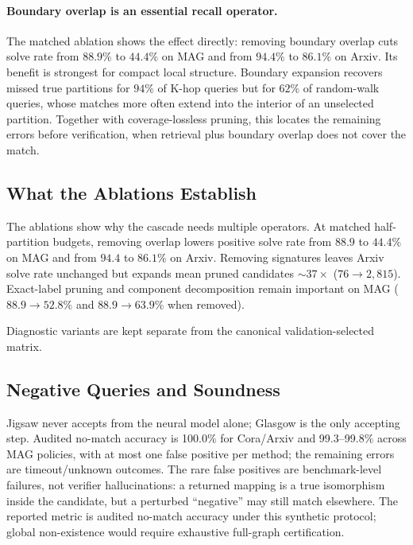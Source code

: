 \documentclass[runningheads]{llncs}
\begin{document}
\paragraph{Boundary overlap is an essential recall operator.}
The matched ablation shows the effect directly: removing boundary overlap cuts solve rate from $88.9\%$ to $44.4\%$ on MAG and from $94.4\%$ to $86.1\%$ on Arxiv. Its benefit is strongest for compact local structure. Boundary expansion recovers missed true partitions for $94\%$ of K-hop queries but for $62\%$ of random-walk queries, whose matches more often extend into the interior of an unselected partition. Together with coverage-lossless pruning, this locates the remaining errors before verification, when retrieval plus boundary overlap does not cover the match.

\subsection{What the Ablations Establish}

The ablations show why the cascade needs multiple operators. At matched half-partition budgets, removing overlap lowers positive solve rate from $88.9$ to $44.4\%$ on MAG and from $94.4$ to $86.1\%$ on Arxiv. Removing signatures leaves Arxiv solve rate unchanged but expands mean pruned candidates ${\sim}37\times$ ($76\to2{,}815$). Exact-label pruning and component decomposition remain important on MAG ($88.9\to52.8\%$ and $88.9\to63.9\%$ when removed).

Diagnostic variants are kept separate from the canonical validation-selected matrix.

\subsection{Negative Queries and Soundness}

Jigsaw never accepts from the neural model alone; Glasgow is the only accepting step. Audited no-match accuracy is 100.0\% for Cora/Arxiv and 99.3--99.8\% across MAG policies, with at most one false positive per method; the remaining errors are timeout/unknown outcomes. The rare false positives are benchmark-level failures, not verifier hallucinations: a returned mapping is a true isomorphism inside the candidate, but a perturbed ``negative'' may still match elsewhere. The reported metric is audited no-match accuracy under this synthetic protocol; global non-existence would require exhaustive full-graph certification.
\end{document}
